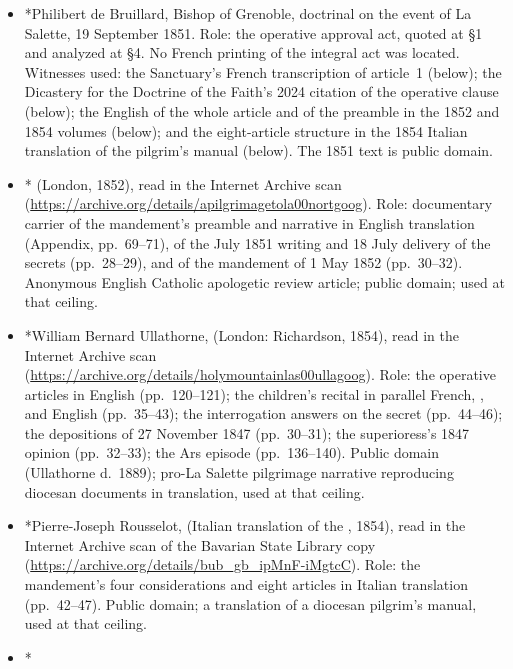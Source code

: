 \begin{itemize}
\item *Philibert de Bruillard, Bishop of Grenoble, doctrinal
 on the event of La Salette, 19 September 1851.
Role: the operative approval act, quoted at \S1 and analyzed at
\S4. No French printing of the integral act was located. Witnesses
used: the Sanctuary's French transcription of article~1 (below); the
Dicastery for the Doctrine of the Faith's 2024 citation of the
operative clause (below); the English of the whole article and of
the preamble in the 1852 and 1854 volumes (below); and the
eight-article structure in the 1854 Italian translation of the
pilgrim's manual (below). The 1851 text is public domain.
\item * (London,
1852), read in the Internet Archive scan
(\url{https://archive.org/details/apilgrimagetola00nortgoog}).
Role: documentary carrier of the mandement's preamble and narrative
in English translation (Appendix, pp.~69--71), of the July 1851
writing and 18 July delivery of the secrets (pp.~28--29), and of the
mandement of 1 May 1852 (pp.~30--32). Anonymous English Catholic
apologetic review article; public domain; used at that ceiling.
\item *William Bernard Ullathorne,  (London: Richardson, 1854),
read in the Internet Archive scan
(\url{https://archive.org/details/holymountainlas00ullagoog}).
Role: the operative articles in English (pp.~120--121); the
children's recital in parallel French, , and English
(pp.~35--43); the interrogation answers on the secret (pp.~44--46);
the depositions of 27 November 1847 (pp.~30--31); the superioress's
1847 opinion (pp.~32--33); the Ars episode (pp.~136--140). Public
domain (Ullathorne d.~1889); pro-La Salette pilgrimage narrative
reproducing diocesan documents in translation, used at that ceiling.
\item *Pierre-Joseph Rousselot,  (Italian translation of the
, 1854), read in the Internet Archive scan
of the Bavarian State Library copy
(\url{https://archive.org/details/bub_gb_ipMnF-iMgtcC}). Role: the
mandement's four considerations and eight articles in Italian
translation (pp.~42--47). Public domain; a translation of a
diocesan pilgrim's manual, used at that ceiling.
\item *
\end{itemize}
